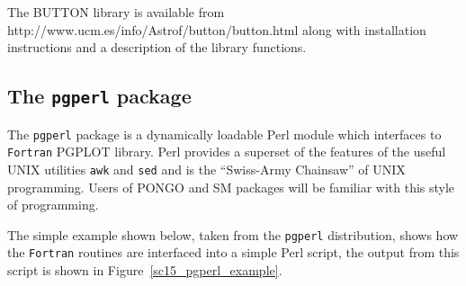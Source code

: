\documentclass[twoside,11pt]{article}
\newcommand{\htmladdnormallink}[2]{#1}
\newcommand{\htmlref}[2]{#1}
\newcommand{\xlabel}[1]{}
\begin{document}
The BUTTON library is available from \htmladdnormallink{   http://www.ucm.es/info/Astrof/button/button.html}{    http://www.ucm.es/info/Astrof/button/button.html} along with installation instructions and a description of the library functions.
       
\subsection{\xlabel{sc15_pgperl}The {\tt pgperl} package\label{sc15_pgperl}}

The \htmladdnormallink{{\tt pgperl}}{http://www.aao.gov.au/local/www/kgb/pgperl/} package is a dynamically loadable \htmladdnormallink{Perl}{http://www.perl.com/} module which interfaces to {\tt Fortran} PGPLOT library. Perl provides a superset of the features of the useful UNIX utilities \texttt{awk} and \texttt{sed} and is the ``Swiss-Army Chainsaw'' of UNIX programming. Users of \htmlref{PONGO}{sc15_pongo} and \htmlref{SM}{sc15_sm} packages will be familiar with this style of programming. 

The simple example shown below, taken from the {\tt pgperl} distribution, shows how the {\tt Fortran} routines are interfaced into a simple Perl script, the output from this script is shown in Figure~\ref{sc15_pgperl_example}.
\end{document}
